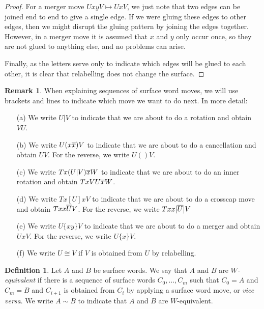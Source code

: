 \documentclass[reqno]{amsart}
\theoremstyle{definition}
\newtheorem{remark}[theorem]{Remark}
\newtheorem{definition}[theorem]{Definition}
\begin{document}
\begin{proof}
 For a merger move $UxyV\mapsto UxV$, we just note that two edges
 can be joined end to end to give a single edge.  If we were
 gluing these edges to other edges, then we might disrupt the gluing
 pattern by joining the edges together.  However, in a merger move it
 is assumed that $x$ and $y$ only occur once, so they are not glued to
 anything else, and no problems can arise.

 Finally, as the letters serve only to indicate which edges will be
 glued to each other, it is clear that relabelling does not change the surface.
\end{proof}

\begin{remark}\label{rem-brackets}
 When explaining sequences of surface word moves, we will use brackets
 and lines to indicate which move we want to do next.  In more detail:
 \begin{itemize}
  \item[(a)] We write $U|V$ to indicate that we are about to do a
   rotation and obtain $VU$.
  \item[(b)] We write $U(x\overline{x})V$ to indicate that we are about to do a
   cancellation and obtain $UV$.  For the reverse, we write $U()V$.
  \item[(c)] We write $Tx(U|V)\overline{x} W$ to indicate that we are about to
   do an inner rotation and obtain $TxVU\overline{x} W$.
  \item[(d)] We write $Tx[U]x V$ to indicate that we are about to
   do a crosscap move and obtain $Txx\overline{U}V$.  For the reverse, we
   write $Txx[\overline{U}]V$
  \item[(e)] We write $U\{xy\}V$ to indicate that we are about to
   do a merger and obtain $UxV$.  For the reverse, we write $U\{x\}V$.
  \item[(f)] We write $U\cong V$ if $V$ is obtained from $U$ by
   relabelling. 
 \end{itemize}
\end{remark}

\begin{definition}
 Let $A$ and $B$ be surface words.  We say that $A$ and $B$ are
 \emph{$W$-equivalent} if there is a sequence of surface words
 $C_0,\dotsc,C_m$ such that $C_0=A$ and $C_m=B$ and $C_{i+1}$ is
 obtained from $C_i$ by applying a surface word move, or \emph{vice
  versa}.  We write $A\sim B$ to indicate that $A$ and $B$ are
 $W$-equivalent. 
\end{definition}
\end{document}
